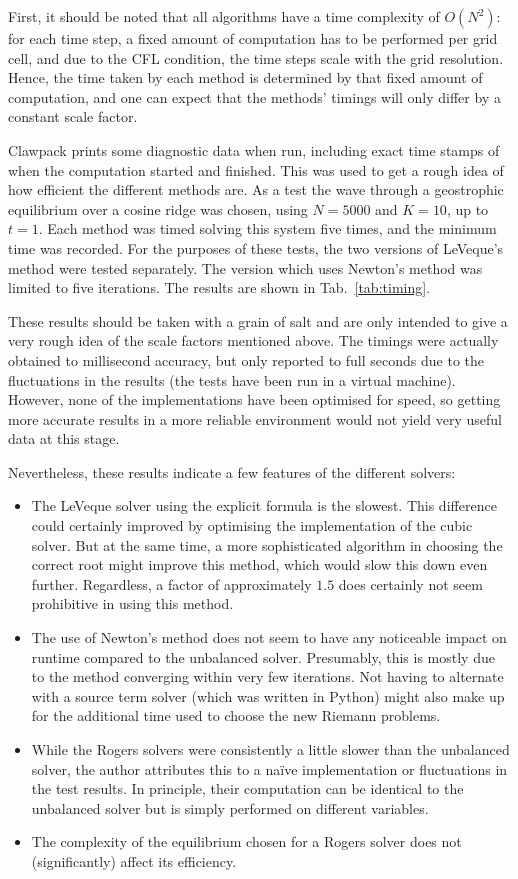 First, it should be noted that all algorithms have a time complexity of $O(N^2)$: for each time step, a fixed amount of computation has to be performed per grid cell, and due to the CFL condition, the time steps scale with the grid resolution. Hence, the time taken by each method is determined by that fixed amount of computation, and one can expect that the methods' timings will only differ by a constant scale factor.

Clawpack prints some diagnostic data when run, including exact time stamps of when the computation started and finished. This was used to get a rough idea of how efficient the different methods are. As a test the wave through a geostrophic equilibrium over a cosine ridge was chosen, using $N = 5000$ and $K = 10$, up to $t = 1$. Each method was timed solving this system five times, and the minimum time was recorded. For the purposes of these tests, the two versions of LeVeque's method were tested separately. The version which uses Newton's method was limited to five iterations. The results are shown in Tab.~\ref{tab:timing}.

These results should be taken with a grain of salt and are only intended to give a very rough idea of the scale factors mentioned above. The timings were actually obtained to millisecond accuracy, but only reported to full seconds due to the fluctuations in the results (the tests have been run in a virtual machine). However, none of the implementations have been optimised for speed, so getting more accurate results in a more reliable environment would not yield very useful data at this stage.

Nevertheless, these results indicate a few features of the different solvers:

\begin{itemize}
  \item The LeVeque solver using the explicit formula is the slowest. This difference could certainly improved by optimising the implementation of the cubic solver. But at the same time, a more sophisticated algorithm in choosing the correct root might improve this method, which would slow this down even further. Regardless, a factor of approximately $1.5$ does certainly not seem prohibitive in using this method.
  \item The use of Newton's method does not seem to have any noticeable impact on runtime compared to the unbalanced solver. Presumably, this is mostly due to the method converging within very few iterations. Not having to alternate with a source term solver (which was written in Python) might also make up for the additional time used to choose the new Riemann problems.
  \item While the Rogers solvers were consistently a little slower than the unbalanced solver, the author attributes this to a na\"ive implementation or fluctuations in the test results. In principle, their computation can be identical to the unbalanced solver but is simply performed on different variables.
  \item The complexity of the equilibrium chosen for a Rogers solver does not (significantly) affect its efficiency.
\end{itemize}